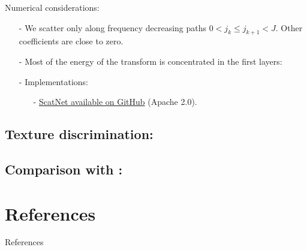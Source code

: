 \documentclass[9pt]{beamer}
\begin{document}
\begin{frame}{Numerical considerations:}
	\begin{itemize}
		\item[-] We scatter only along frequency decreasing paths $0<j_k\leq j_{k+1}<J$. Other coefficients are close to zero.
		\item[-] Most of the energy of the transform is concentrated in the first layers:
		\item[-] Implementations:
		\begin{itemize}
			\item[-] \href{https://github.com/scatnet/scatnet}{ScatNet available on GitHub} (Apache 2.0).
		\end{itemize}
	\end{itemize}
\end{frame}

\subsection[Textures]{Texture discrimination:}

\subsection[Comparison]{Comparison with :}

	
	
	\section*{References}
	\begin{frame}[allowframebreaks]{References}
		
		
	\end{frame}
	
\end{document}
